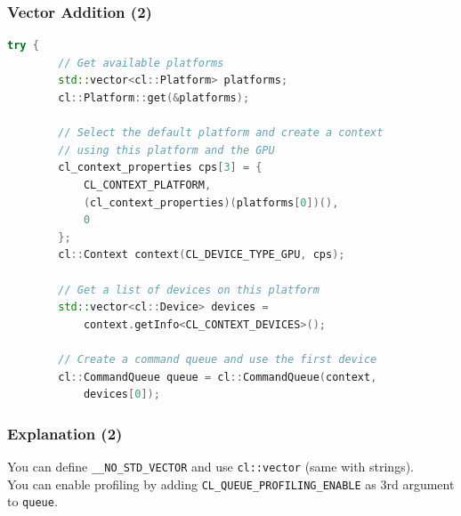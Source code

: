 \begin{frame}[fragile]
  \frametitle{Vector Addition (2)}


  \begin{lstlisting}[language=C++]
    try { 
        // Get available platforms
        std::vector<cl::Platform> platforms;
        cl::Platform::get(&platforms);

        // Select the default platform and create a context
        // using this platform and the GPU
        cl_context_properties cps[3] = { 
            CL_CONTEXT_PLATFORM, 
            (cl_context_properties)(platforms[0])(), 
            0 
        };
        cl::Context context(CL_DEVICE_TYPE_GPU, cps);
 
        // Get a list of devices on this platform
        std::vector<cl::Device> devices =
            context.getInfo<CL_CONTEXT_DEVICES>();
 
        // Create a command queue and use the first device
        cl::CommandQueue queue = cl::CommandQueue(context,
            devices[0]);
  \end{lstlisting}

\end{frame}

\begin{frame}
  \frametitle{Explanation (2)}



    You can define {\tt \_\_NO\_STD\_VECTOR} and use {\tt cl::vector}
      (same with strings).\\[1em]
    You can enable profiling by adding {\tt CL\_QUEUE\_PROFILING\_ENABLE}
      as 3rd argument to {\tt queue}.

\end{frame}

